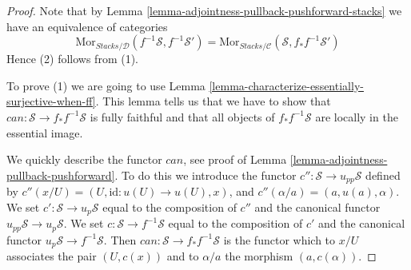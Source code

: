 \begin{proof}
Note that by
Lemma \ref{lemma-adjointness-pullback-pushforward-stacks}
we have an equivalence of categories
$$
\text{Mor}_{\textit{Stacks}/\mathcal{D}}(f^{-1}\mathcal{S}, f^{-1}\mathcal{S}')
=
\text{Mor}_{\textit{Stacks}/\mathcal{C}}(\mathcal{S}, f_*f^{-1}\mathcal{S}')
$$
Hence (2) follows from (1).

\medskip\noindent
To prove (1) we are going to use
Lemma \ref{lemma-characterize-essentially-surjective-when-ff}.
This lemma tells us that we have to show that 
$can : \mathcal{S} \to f_*f^{-1}\mathcal{S}$ is
fully faithful and that all objects of $f_*f^{-1}\mathcal{S}$
are locally in the essential image.

\medskip\noindent
We quickly describe the functor $can$, see proof of
Lemma \ref{lemma-adjointness-pullback-pushforward}.
To do this we introduce the functor
$c'' : \mathcal{S} \to u_{pp}\mathcal{S}$ defined by
$c''(x/U) = (U, \text{id} : u(U) \to u(U), x)$, and
$c''(\alpha/a) = (a, u(a), \alpha)$. We set
$c' : \mathcal{S} \to u_p\mathcal{S}$ equal to the composition
of $c''$ and the canonical functor $u_{pp}\mathcal{S} \to u_p\mathcal{S}$.
We set $c : \mathcal{S} \to f^{-1}\mathcal{S}$ equal to the composition
of $c'$ and the canonical functor $u_p\mathcal{S} \to f^{-1}\mathcal{S}$.
Then $can : \mathcal{S} \to f_*f^{-1}\mathcal{S}$ is the functor
which to $x/U$ associates the pair $(U, c(x))$ and to
$\alpha/a$ the morphism $(a, c(\alpha))$.


\end{proof}
